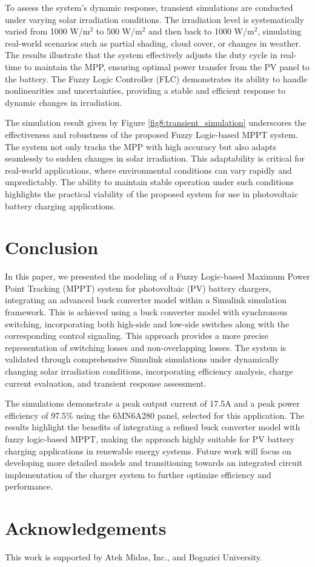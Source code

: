 \documentclass[conference]{IEEEtran}
\begin{document}
To assess the system's dynamic response, transient simulations are conducted under varying solar irradiation conditions. The irradiation level is systematically varied from 1000 W/m\(^2\) to 500 W/m\(^2\) and then back to 1000 W/m\(^2\), simulating real-world scenarios such as partial shading, cloud cover, or changes in weather. The results illustrate that the system effectively adjusts the duty cycle in real-time to maintain the MPP, ensuring optimal power transfer from the PV panel to the battery. The Fuzzy Logic Controller (FLC) demonstrates its ability to handle nonlinearities and uncertainties, providing a stable and efficient response to dynamic changes in irradiation.

The simulation result given by Figure \ref{fig8:transient_simulation} underscores the effectiveness and robustness of the proposed Fuzzy Logic-based MPPT system. The system not only tracks the MPP with high accuracy but also adapts seamlessly to sudden changes in solar irradiation. This adaptability is critical for real-world applications, where environmental conditions can vary rapidly and unpredictably. The ability to maintain stable operation under such conditions highlights the practical viability of the proposed system for use in photovoltaic battery charging applications.


\section{Conclusion}
In this paper, we presented the modeling of a Fuzzy Logic-based Maximum Power Point Tracking (MPPT) system for photovoltaic (PV) battery chargers, integrating an advanced buck converter model within a Simulink simulation framework. 
This is achieved using a buck converter model with synchronous switching, incorporating both high-side and low-side switches along with the corresponding control signaling. This approach provides a more precise representation of switching losses and non-overlapping losses.
The system is validated through comprehensive Simulink simulations under dynamically changing solar irradiation conditions, incorporating efficiency analysis, charge current evaluation, and transient response assessment. 

The simulations demonstrate a peak output current of 17.5A and a peak power efficiency of 97.5\% using the 6MN6A280 panel, selected for this application. The results highlight the benefits of integrating a refined buck converter model with fuzzy logic-based MPPT, making the approach highly suitable for PV battery charging applications in renewable energy systems. Future work will focus on developing more detailed models and transitioning towards an integrated circuit implementation of the charger system to further optimize efficiency and performance.


\section*{Acknowledgements}
This work is supported by Atek Midas, Inc., and Bogazici University.


\end{document}
